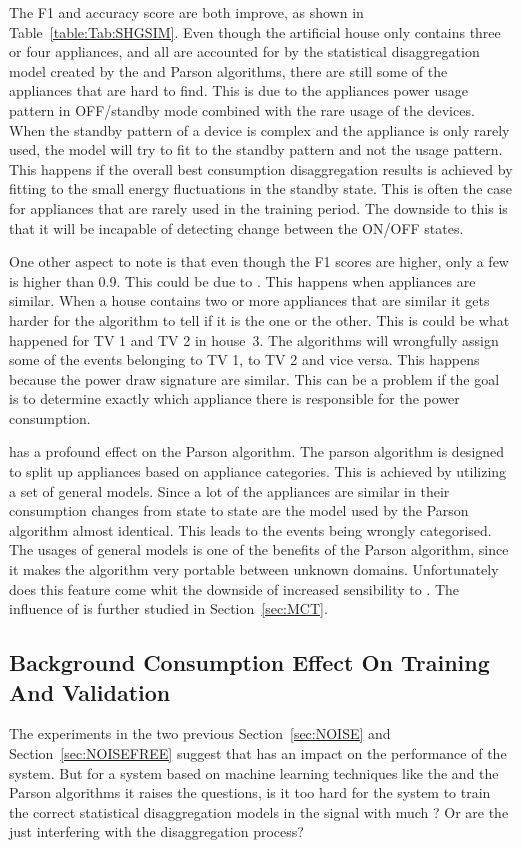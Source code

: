 The F1 and accuracy score are both improve, as shown in Table~\ref{table:Tab:SHGSIM}. Even though the artificial house only contains three or four appliances, and all are accounted for by the statistical disaggregation model created by the  and Parson algorithms, there are still some of the appliances that are hard to find. This is due to the appliances power usage pattern in OFF/standby mode combined with the rare usage of the devices. When the standby pattern of a device is complex and the appliance is only rarely used, the model will try to fit to the standby pattern and not the usage pattern. This happens if the overall best consumption disaggregation results is achieved by fitting to the small energy fluctuations in the standby state. This is often the case for appliances that are rarely used in the training period. The downside to this is that it will be incapable of detecting change between the ON/OFF states.

One other aspect to note is that even though the F1 scores are higher, only a few is higher than 0.9. 
This could be due to . This happens when appliances are similar. When a house contains two or more appliances that are similar it gets harder for the algorithm to tell if it is the one or the other. This is could be what happened for TV 1 and TV 2 in house~3. The algorithms will wrongfully assign some of the events belonging to TV 1, to TV 2 and vice versa. This happens because the power draw signature are similar.  This can be a problem if the goal is to determine exactly which appliance there is responsible for the power consumption.

 has a profound effect on the Parson algorithm. The parson algorithm is designed to split up appliances based on appliance categories. This is achieved by utilizing a set of general models. Since a lot of the appliances are similar in their consumption changes from state to state are the model used by the Parson algorithm almost identical. This leads to the events being wrongly categorised. The usages of general models is one of the benefits of the Parson algorithm, since it makes the algorithm very portable between unknown domains. Unfortunately does this feature come whit the downside of increased sensibility to . The influence of  is further studied in Section~\ref{sec:MCT}. 


\newpage

\subsection{Background Consumption Effect On Training And Validation }
The experiments in the two previous Section~\ref{sec:NOISE} and Section~\ref{sec:NOISEFREE} suggest that  has an impact on the performance of the system. But for a system based on machine learning techniques like the  and the Parson algorithms it raises the questions, is it too hard for the system to train the correct statistical disaggregation models in the signal with much ? Or are the  just interfering with the disaggregation process? 

